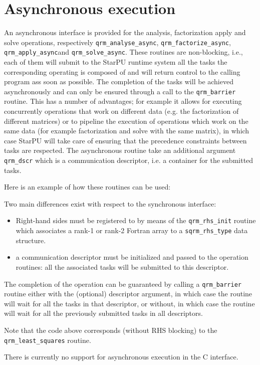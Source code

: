 \documentclass[11pt]{article}
\begin{document}



\section{Asynchronous execution}

An asynchronous interface is provided for the analysis, factorization
apply and solve operations, respectively \texttt{qrm\_analyse\_async},
\texttt{qrm\_factorize\_async}, \texttt{qrm\_apply\_async}and
\texttt{qrm\_solve\_async}. These routines are non-blocking, i.e.,
each of them will submit to the StarPU runtime system all the tasks
the corresponding operating is composed of and will return control to
the calling program ass soon as possible. The completion of the tasks
will be achieved asynchronously and can only be ensured through a call
to the \texttt{qrm\_barrier} routine. This has a number of advantages;
for example it allows for executing concurrently operations that work
on different data (e.g. the factorization of different matrices) or to
pipeline the execution of operations which work on the same data (for
example factorization and solve with the same matrix), in which case
StarPU will take care of ensuring that the precedence constraints
between tasks are respected. The asynchronous routine take an
additional argument \texttt{qrm\_dscr} which is a communication
descriptor, i.e. a container for the submitted tasks. 

Here is an example of how these routines can be used:



Two main differences exist with respect to the synchronous interface:
\begin{itemize}
\item Right-hand sides must be registered to \qrm by means of the
  \texttt{qrm\_rhs\_init} routine which associates a rank-1 or rank-2
  Fortran array to a \texttt{sqrm\_rhs\_type} data structure.
\item a communication descriptor must be initialized and passed to the
  operation routines: all the associated tasks will be submitted to
  this descriptor.
\end{itemize}

The completion of the operation can be guaranteed by calling a
\texttt{qrm\_barrier} routine either with the (optional) descriptor
argument, in which case the routine will wait for all the tasks in
that descriptor, or without, in which case the routine will wait for
all the previously submitted tasks in all descriptors.

Note that the code above corresponds (without RHS blocking) to the
\texttt{qrm\_least\_squares} routine.

There is currently no support for asynchronous execution in the \qrm C
interface.



\end{document}
